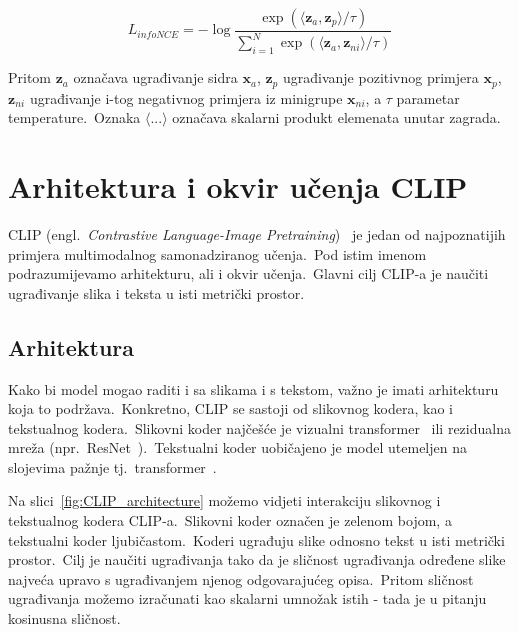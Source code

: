 \documentclass[times, utf8, seminar, numeric]{fer}
\begin{document}
\begin{equation}
    L_{infoNCE} = - \log{\frac{\exp(\langle \bm{z}_{a}, \bm{z}_{p} \rangle / \tau)}{\sum_{i=1}^{N}{\exp(\langle \bm{z}_{a}, \bm{z}_{ni} \rangle / \tau)}}}
    \label{eq:infoNCE}
\end{equation}

Pritom $\bm{z}_{a}$ označava ugrađivanje sidra $\bm{x}_{a}$, $\bm{z}_{p}$ ugrađivanje pozitivnog primjera $\bm{x}_{p}$, $\bm{z}_{ni}$ ugrađivanje i-tog negativnog primjera iz minigrupe $\bm{x}_{ni}$, a $\tau$ parametar temperature.\ 
Oznaka $\langle ... \rangle$ označava skalarni produkt elemenata unutar zagrada.\

\section{Arhitektura i okvir učenja CLIP}

CLIP (engl.\ \textit{Contrastive Language-Image Pretraining})~\cite{radford2021learning} je jedan od najpoznatijih primjera multimodalnog samonadziranog učenja.\ 
Pod istim imenom podrazumijevamo arhitekturu, ali i okvir učenja.\ Glavni cilj CLIP-a je naučiti ugrađivanje slika i teksta u isti metrički prostor.\ 

\subsection{Arhitektura}

Kako bi model mogao raditi i sa slikama i s tekstom, važno je imati arhitekturu koja to podržava.\ Konkretno, CLIP se sastoji od slikovnog kodera, kao i tekstualnog kodera.\ 
Slikovni koder najčešće je vizualni transformer~\cite{han2021transformer} ili rezidualna mreža (npr.\ ResNet~\cite{he2016identity}).\ 
Tekstualni koder uobičajeno je model utemeljen na slojevima pažnje tj.\ transformer~\cite{vaswani2017attention}.\ 

Na slici~\ref{fig:CLIP_architecture} možemo vidjeti interakciju slikovnog i tekstualnog kodera CLIP-a.\ Slikovni koder označen je zelenom bojom, a tekstualni koder ljubičastom.\ 
Koderi ugrađuju slike odnosno tekst u isti metrički prostor.\ Cilj je naučiti ugrađivanja tako da je sličnost ugrađivanja određene slike najveća upravo s ugrađivanjem njenog odgovarajućeg opisa.\ 
Pritom sličnost ugrađivanja možemo izračunati kao skalarni umnožak istih - tada je u pitanju kosinusna sličnost.\

\pagebreak
\end{document}
